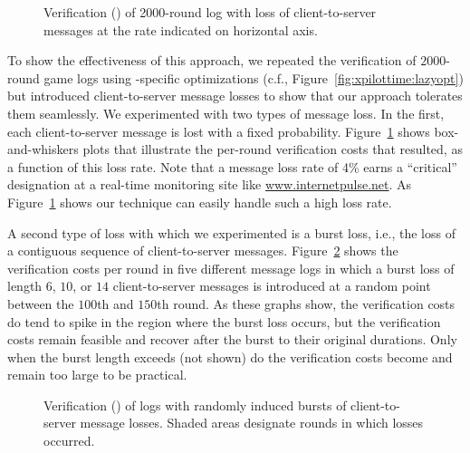\begin{figure}[t]
\centering
\caption{Verification (\lazy) of 2000-round \xpilot log with loss of
client-to-server messages at the rate indicated on horizontal axis.}
\label{fig:random_loss} 
\end{figure}

To show the effectiveness of this approach, we repeated the
\lazy verification of $2000$-round \xpilot game logs using \xpilot-specific
optimizations (c.f., Figure~\ref{fig:xpilottime:lazyopt}) but
introduced client-to-server message losses to show that our approach
tolerates them seamlessly.  We experimented with two types of message
loss.  In the first, each client-to-server message is lost with a
fixed probability.  Figure~\ref{fig:random_loss} shows
box-and-whiskers plots that illustrate the per-round verification
costs that resulted, as a function of this loss rate.  Note that a
message loss rate of 4\% earns a ``critical'' designation at a
real-time monitoring site like \url{www.internetpulse.net}.  As
Figure~\ref{fig:random_loss} shows our technique can easily handle
such a high loss rate.

A second type of loss with which we experimented is a burst loss,
i.e., the loss of a contiguous sequence of client-to-server messages.
Figure~\ref{fig:burst_loss} shows the verification costs per round in
five different message logs in which a burst loss of length $6$, $10$,
or $14$ client-to-server messages is introduced at a random point
between the $100$th and $150$th round.  As these graphs show, the
verification costs do tend to spike in the region where the burst loss
occurs, but the verification costs remain feasible and recover after
the burst to their original durations.  Only when the burst length
exceeds \hashsize (not shown) do the verification costs become and
remain too large to be practical.

\begin{figure}[ht]
\caption{Verification (\lazy) of \xpilot logs with randomly induced
bursts of client-to-server message losses.  Shaded areas designate
rounds in which losses occurred.}
\label{fig:burst_loss}
\end{figure}
\clearpage


